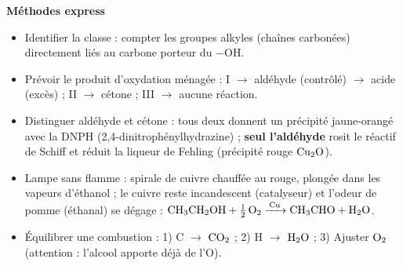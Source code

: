 \documentclass[11pt]{article}
\newcommand{\cle}[1]{{\popxbold\color{popdark}#1}}
\begin{document}
\begin{propriete}
\textbf{Méthodes express}
\begin{itemize}
  \item \cle{Identifier la classe} : compter les groupes alkyles (chaînes carbonées) directement liés au carbone porteur du $-\mathrm{OH}$.
  \item \cle{Prévoir le produit d'oxydation ménagée} : I $\to$ aldéhyde (contrôlé) $\to$ acide (excès) ; II $\to$ cétone ; III $\to$ aucune réaction.
  \item \cle{Distinguer aldéhyde et cétone} : tous deux donnent un précipité jaune-orangé avec la \cle{DNPH} (2,4-dinitrophénylhydrazine) ; \textbf{seul l'aldéhyde} rosit le réactif de \cle{Schiff} et réduit la liqueur de \cle{Fehling} (précipité rouge $\ce{Cu2O}$).
  \item \cle{Lampe sans flamme} : spirale de cuivre chauffée au rouge, plongée dans les vapeurs d'éthanol ; le cuivre reste incandescent (catalyseur) et l'odeur de pomme (éthanal) se dégage : $\ce{CH3CH2OH + 1/2 O2 ->[Cu] CH3CHO + H2O}$.
  \item \cle{Équilibrer une combustion} : 1) C $\to$ $\ce{CO2}$ ; 2) H $\to$ $\ce{H2O}$ ; 3) Ajuster $\ce{O2}$ (attention : l'alcool apporte déjà de l'O).
\end{itemize}
\end{propriete}
\end{document}
